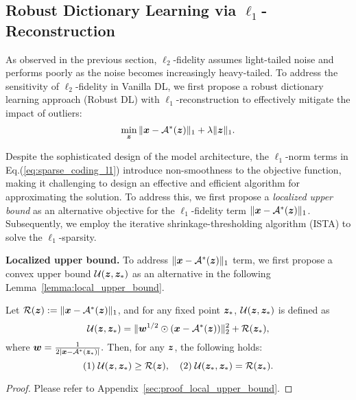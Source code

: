 
\subsection{Robust Dictionary Learning via $\ell_1$-Reconstruction}
\label{sec:rdl}



As observed in the previous section, $\ell_2$-fidelity assumes light-tailed noise and performs poorly as the noise becomes increasingly heavy-tailed. 
To address the sensitivity of $\ell_2$-fidelity in Vanilla DL, we first propose a robust dictionary learning approach (Robust DL) with $\ell_1$-reconstruction to effectively mitigate the impact of outliers:
\begin{equation}
\min_{\bm{z}} \|{\bm{x}} - {\mathcal{A}}^*({\bm{z}})\|_1+\lambda\|{\bm{z}}\|_1.
\label{eq:sparse_coding_l1}
\end{equation} 


Despite the sophisticated design of the model architecture, the $\ell_1$-norm terms in Eq.(\ref{eq:sparse_coding_l1}) introduce non-smoothness to the objective function, making it challenging to design an effective and efficient algorithm for approximating the solution. To address this, we first propose a \emph{localized upper bound} as an alternative objective for the $\ell_1$-fidelity term $\|{\bm{x}} - {\mathcal{A}}^*({\bm{z}})\|_1$. Subsequently, we employ the iterative shrinkage-thresholding algorithm (ISTA) to solve the $\ell_1$-sparsity.

\textbf{Localized upper bound.}
To address $\|{\bm{x}} - {\mathcal{A}}^*({\bm{z}})\|_1$ term, we first propose a convex upper bound ${\mathcal{U}}({\bm{z}},{\bm{z}}_*)$  as an alternative in the following Lemma~\ref{lemma:local_upper_bound}.
\begin{lemma}
\label{lemma:local_upper_bound}
Let ${\mathcal{R}}({\bm{z}}):=\|{\bm{x}}-{\mathcal{A}}^*({\bm{z}})\|_1$, and for any fixed point ${\bm{z}}_*$,  ${\mathcal{U}}({\bm{z}},{\bm{z}}_*)$ is defined as 
\begin{equation}
    \label{eq:upper_bound}
    {\mathcal{U}}({\bm{z}},{\bm{z}}_*)=\|{\bm{w}}^{1/2}\odot ({\bm{x}}-{\mathcal{A}}^*({\bm{z}}))\|_2^2+{\mathcal{R}}({\bm{z}}_*),
\end{equation}
where ${\bm{w}}= \frac{1}{2|{\bm{x}}-{\mathcal{A}}^*({\bm{z}}_*)|}.$
Then, for any ${\bm{z}}$, the following holds:
$$(1)\; {\mathcal{U}}({\bm{z}},{\bm{z}}_*) \geq {\mathcal{R}}({\bm{z}}), \quad (2)\; {\mathcal{U}}({\bm{z}}_*,{\bm{z}}_*) = {\mathcal{R}}({\bm{z}}_*) .$$
\end{lemma}
\begin{proof}
    Please refer to Appendix~\ref{sec:proof_local_upper_bound}.
\end{proof}


